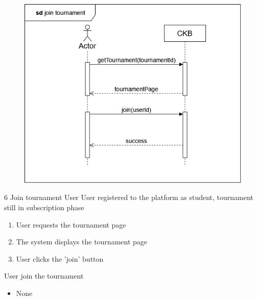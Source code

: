 \usecase
{
    \begin{figure}[H]
        \centering
        \includegraphics[width=\textwidth]{src/sd_diagrams/jointourn.png}
    \end{figure}
}
{6}
{Join tournament} %
{User} %
{User registered to the platform as student, tournament still in subscription phase} %
{ %
    \begin{enumerate}
        \item User requests the tournament page
        \item The system displays the tournament page
        \item User clicks the 'join' button
    \end{enumerate}
}
{User join the tournament} %
{ %
    \begin{itemize}
        \item None
    \end{itemize}
}
{ %

}


